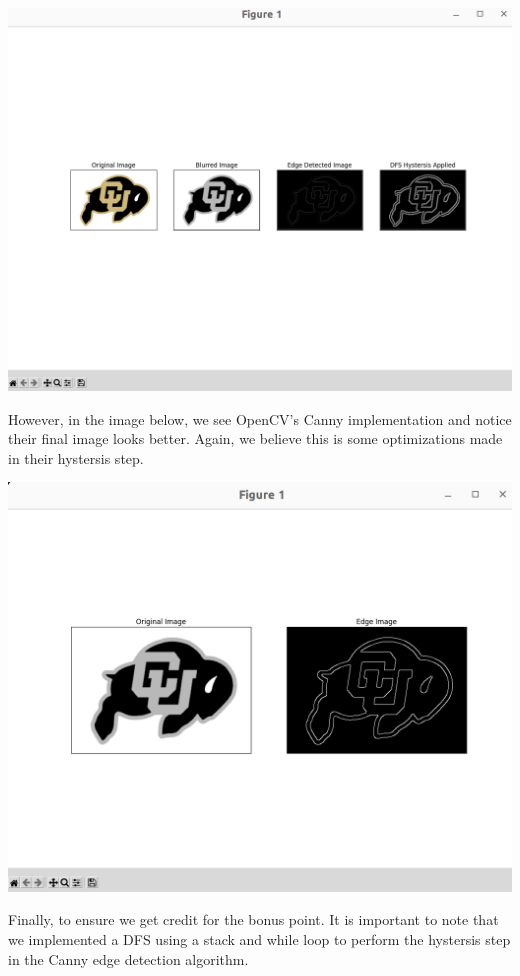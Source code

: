 \documentclass{article}
\numberwithin{equation}{section} %
\numberwithin{figure}{section} %
\numberwithin{table}{section} %
\begin{document}
\begin{framed}
\begin{center}
\includegraphics[scale=.25]{ourCanny.png}
\end{center}

However, in the image below, we see OpenCV's Canny implementation and notice their final image looks better.  Again, we believe this is some optimizations made in their hystersis step.

\begin{center}
\includegraphics[scale=.25]{thierCanny.png}
\end{center}

Finally, to ensure we get credit for the bonus point.  It is important to note that we implemented a DFS using a stack and while loop to perform the hystersis step in the Canny edge detection algorithm.

\end{framed}
\end{document}
